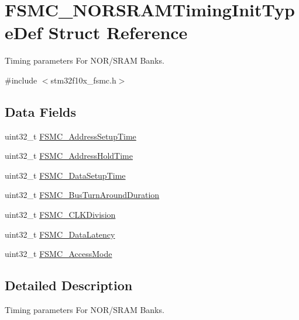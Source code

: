 \hypertarget{struct_f_s_m_c___n_o_r_s_r_a_m_timing_init_type_def}{}\section{F\+S\+M\+C\+\_\+\+N\+O\+R\+S\+R\+A\+M\+Timing\+Init\+Type\+Def Struct Reference}
\label{struct_f_s_m_c___n_o_r_s_r_a_m_timing_init_type_def}


Timing parameters For N\+O\+R/\+S\+R\+AM Banks.  




{\ttfamily \#include $<$stm32f10x\+\_\+fsmc.\+h$>$}

\subsection*{Data Fields}
\begin{DoxyCompactItemize}
\item 
uint32\+\_\+t \mbox{\hyperlink{struct_f_s_m_c___n_o_r_s_r_a_m_timing_init_type_def_a947aed7df4d7c0d0959e1af373780b44}{F\+S\+M\+C\+\_\+\+Address\+Setup\+Time}}
\item 
uint32\+\_\+t \mbox{\hyperlink{struct_f_s_m_c___n_o_r_s_r_a_m_timing_init_type_def_ae220905040829fa65a833ddbae7fa119}{F\+S\+M\+C\+\_\+\+Address\+Hold\+Time}}
\item 
uint32\+\_\+t \mbox{\hyperlink{struct_f_s_m_c___n_o_r_s_r_a_m_timing_init_type_def_a8c62c50435a67ef4de2f27b539c4c851}{F\+S\+M\+C\+\_\+\+Data\+Setup\+Time}}
\item 
uint32\+\_\+t \mbox{\hyperlink{struct_f_s_m_c___n_o_r_s_r_a_m_timing_init_type_def_a015f5751cbb8c607102d8c735988c5c7}{F\+S\+M\+C\+\_\+\+Bus\+Turn\+Around\+Duration}}
\item 
uint32\+\_\+t \mbox{\hyperlink{struct_f_s_m_c___n_o_r_s_r_a_m_timing_init_type_def_a4258c6027193e72763ab139cfd3af065}{F\+S\+M\+C\+\_\+\+C\+L\+K\+Division}}
\item 
uint32\+\_\+t \mbox{\hyperlink{struct_f_s_m_c___n_o_r_s_r_a_m_timing_init_type_def_a656a0608f822088c5a94c926447a5e06}{F\+S\+M\+C\+\_\+\+Data\+Latency}}
\item 
uint32\+\_\+t \mbox{\hyperlink{struct_f_s_m_c___n_o_r_s_r_a_m_timing_init_type_def_a11e5eff4e9915ddeac992c283094ae37}{F\+S\+M\+C\+\_\+\+Access\+Mode}}
\end{DoxyCompactItemize}


\subsection{Detailed Description}
Timing parameters For N\+O\+R/\+S\+R\+AM Banks. 



